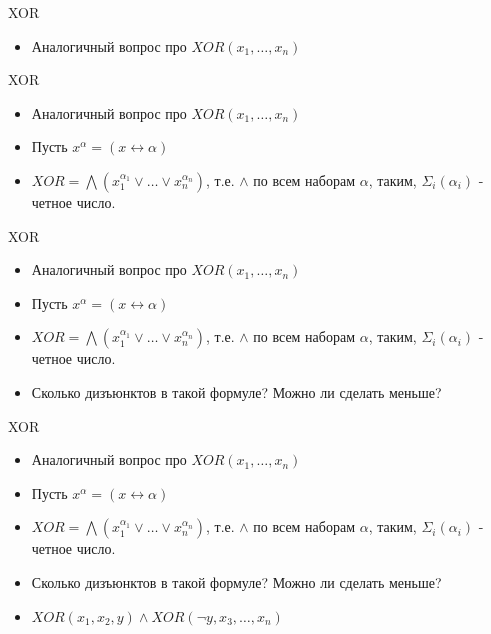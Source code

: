 \documentclass{beamer}
\begin{document}
\begin{frame}{XOR}
\begin{itemize}
\item Аналогичный вопрос про $XOR(x_1, \dots, x_n)$
\end{itemize}
\end{frame}

\begin{frame}{XOR}
\begin{itemize}
\item Аналогичный вопрос про $XOR(x_1, \dots, x_n)$
\item Пусть $x^{\alpha} = (x \leftrightarrow \alpha)$
\item $XOR = \bigwedge(x_1^{\alpha_1} \vee \dots \vee x_n^{\alpha_n})$, т.е. $\wedge$ по всем наборам $\alpha$, таким,
$\Sigma_i(\alpha_i)$ - четное число.
\end{itemize}
\end{frame}

\begin{frame}{XOR}
\begin{itemize}
\item Аналогичный вопрос про $XOR(x_1, \dots, x_n)$
\item Пусть $x^{\alpha} = (x \leftrightarrow \alpha)$
\item $XOR = \bigwedge(x_1^{\alpha_1} \vee \dots \vee x_n^{\alpha_n})$, т.е. $\wedge$ по всем наборам $\alpha$, таким,
$\Sigma_i(\alpha_i)$ - четное число.
\item Сколько дизъюнктов в такой формуле? Можно ли сделать меньше?
\end{itemize}
\end{frame}

\begin{frame}{XOR}
\begin{itemize}
\item Аналогичный вопрос про $XOR(x_1, \dots, x_n)$
\item Пусть $x^{\alpha} = (x \leftrightarrow \alpha)$
\item $XOR = \bigwedge(x_1^{\alpha_1} \vee \dots \vee x_n^{\alpha_n})$, т.е. $\wedge$ по всем наборам $\alpha$, таким,
$\Sigma_i(\alpha_i)$ - четное число.
\item Сколько дизъюнктов в такой формуле? Можно ли сделать меньше?
\item $XOR(x_1, x_2, y) \wedge XOR(\lnot y, x_3, \dots, x_n)$
\end{itemize}
\end{frame}
\end{document}
